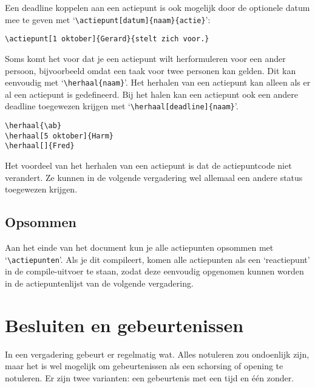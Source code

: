 \documentclass[a4paper]{notulen}
\begin{document}
			Een deadline koppelen aan een actiepunt is ook mogelijk door de optionele datum mee te geven met `\lstinline!\actiepunt[datum]{naam}{actie}!':
			
			
			\begin{lstlisting}
\actiepunt[1 oktober]{Gerard}{stelt zich voor.}
			\end{lstlisting}
			
			Soms komt het voor dat je een actiepunt wilt herformuleren voor een ander persoon, bijvoorbeeld omdat een taak voor twee personen kan 
			gelden. Dit kan eenvoudig met `\lstinline!\herhaal{naam}!'. Het herhalen van een actiepunt kan alleen als er al een actiepunt is
			gedefineerd. Bij het halen kan een actiepunt ook een andere deadline toegewezen krijgen met `\lstinline!\herhaal[deadline]{naam}!'.
			
			\herhaal{\ab}
			
			\begin{lstlisting}
\herhaal{\ab}
\herhaal[5 oktober]{Harm}
\herhaal[]{Fred}
			\end{lstlisting}
			
			Het voordeel van het herhalen van een actiepunt is dat de actiepuntcode niet verandert. Ze kunnen in de volgende vergadering wel allemaal
			een andere status toegewezen krijgen.
			
		\subsection{Opsommen}
			Aan het einde van het document kun je alle actiepunten opsommen met `\lstinline!\actiepunten!'. Als je dit compileert, komen alle actiepunten
			als een `reactiepunt' in de compile-uitvoer te staan, zodat deze eenvoudig opgenomen kunnen worden in de actiepuntenlijst van de volgende
			vergadering.
			
	\section{Besluiten en gebeurtenissen}
		In een vergadering gebeurt er regelmatig wat. Alles notuleren zou ondoenlijk zijn, maar het is wel mogelijk om gebeurtenissen als een
		schorsing of opening te notuleren. Er zijn twee varianten: een gebeurtenis met een tijd en \'e\'en zonder.
		
		
\end{document}
